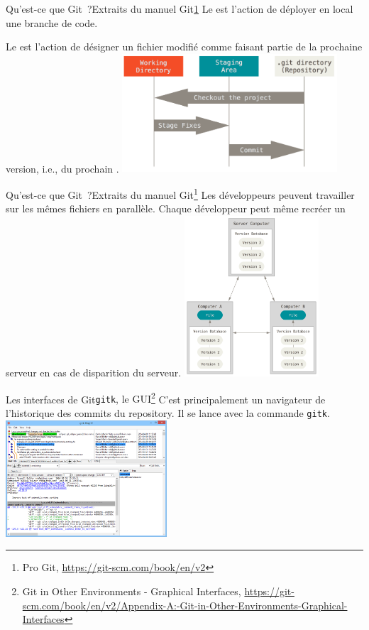 \documentclass{beamer}
\begin{document}
    \begin{frame}{Qu'est-ce que Git~?}{Extraits du manuel Git\cref{progit}}
        \transdissolve
        Le  est l'action de déployer en local une branche de code.

        Le  est l'action de désigner un fichier modifié comme faisant partie de la prochaine version, i.e., du prochain .
        \bigbreak
        \centering
        \includegraphics[width=8cm]{image/git-local-areas}
    \end{frame}

    \begin{frame}{Qu'est-ce que Git~?}{Extraits du manuel Git\footnote{\label{progit}Pro Git, \url{https://git-scm.com/book/en/v2}}}
        \transdissolve
        Les développeurs peuvent travailler sur les mêmes fichiers en parallèle.
        Chaque développeur peut même recréer un serveur en cas de disparition du serveur.
        \bigbreak
        \centering
        \includegraphics[width=5cm]{image/dvcs-scheme}
    \end{frame}

    \begin{frame}{Les interfaces de Git}{\lstinline{gitk}, le GUI\footnote{Git in Other Environments - Graphical Interfaces, \url{https://git-scm.com/book/en/v2/Appendix-A:-Git-in-Other-Environments-Graphical-Interfaces}}}
        \transdissolve
        C'est principalement un navigateur de l'historique des commits du repository.
        Il se lance avec la commande \lstinline{gitk}.
        \bigbreak
        \centering
        \includegraphics[width=6cm]{image/gitk}
    \end{frame}
\end{document}
